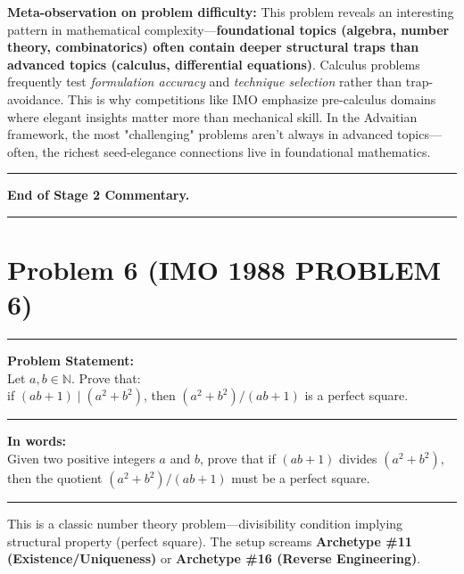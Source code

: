 \documentclass{article}
\begin{document}
\noindent \textbf{Meta-observation on problem difficulty:} This problem reveals an interesting pattern in mathematical complexity—\textbf{foundational topics (algebra, number theory, combinatorics) often contain deeper structural traps than advanced topics (calculus, differential equations)}. Calculus problems frequently test \textit{formulation accuracy} and \textit{technique selection} rather than trap-avoidance. This is why competitions like IMO emphasize pre-calculus domains where elegant insights matter more than mechanical skill. In the Advaitian framework, the most "challenging" problems aren't always in advanced topics—often, the richest seed-elegance connections live in foundational mathematics.

\noindent \rule{\textwidth}{0.4pt}

\noindent \textbf{End of Stage 2 Commentary.}

\noindent \rule{\textwidth}{0.4pt}

\section*{Problem 6 (IMO 1988 PROBLEM 6)}

\noindent \rule{\textwidth}{0.4pt}

\noindent \textbf{Problem Statement:} \\
Let $a, b \in \mathbb{N}$. Prove that: \\
if $(ab + 1) \mid (a^2 + b^2)$, then $(a^2 + b^2)/(ab + 1)$ is a perfect square. \\

\noindent \rule{\textwidth}{0.4pt}

\noindent \textbf{In words:} \\
Given two positive integers $a$ and $b$, prove that if $(ab + 1)$ divides $(a^2 + b^2)$, then the quotient $(a^2 + b^2)/(ab + 1)$ must be a perfect square. \\

\noindent \rule{\textwidth}{0.4pt}

\noindent This is a classic number theory problem—divisibility condition implying structural property (perfect square). The setup screams \textbf{Archetype \#11 (Existence/Uniqueness)} or \textbf{Archetype \#16 (Reverse Engineering)}. \\
\end{document}
